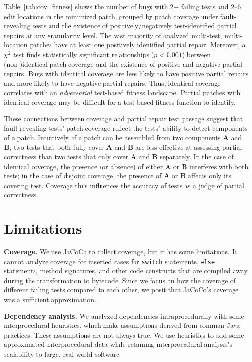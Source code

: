 \documentclass[10pt, conference]{IEEEtran}
\begin{document}
Table~\ref{tab:cov_fitness} shows the number of bugs with 2+ failing tests
and 2--6 edit locations in the minimized patch, grouped by patch coverage
under fault-revealing tests and the existence of positively/negatively test-identified
partial repairs at any granularity level.
The vast majority of analyzed multi-test, multi-location patches have at least
one positively identified partial repair.
Moreover, a $\chi^2$ test finds statistically significant relationships ($p < 0.001$)
between (non-)identical patch coverage and the existence of positive and
negative partial repairs. Bugs with identical coverage are less likely to have
positive partial repairs and more likely to have negative partial repairs.
Thus, identical coverage correlates with an
\emph{adversarial} test-based fitness landscape.
Partial patches with identical coverage may be difficult for a test-based
fitness function to identify.

These connections between coverage and partial repair test passage
suggest that fault-revealing tests' patch coverage reflect the tests' ability
to detect components of a patch.
Intuitively, if a patch can be
assembled from two components \textbf{A} and \textbf{B}, two tests that both
fully cover \textbf{A} and \textbf{B} are less effective at assessing partial
correctness than two tests that only cover \textbf{A} and \textbf{B} separately.
In the case of identical coverage, the presence (or absence) of either \textbf{A} or 
\textbf{B} interferes with both tests; in the case of disjoint coverage, the presence of 
\textbf{A} or \textbf{B} affects only its covering test.
Coverage thus influences the accuracy of tests as a judge of partial correctness.


\section{Limitations}
\label{sec:limits}

\noindent\textbf{Coverage.}
We use JaCoCo to collect coverage, but it has some
limitations. It cannot analyze coverage for inserted
cases for \texttt{switch} statements, \texttt{else} statements, method
signatures, and other code constructs that are compiled away during the
transformation to bytecode. Since we focus on how the coverage of different
failing tests compared to each other, we posit that JaCoCo's coverage was a
sufficient approximation.

\vspace{1ex}
\noindent\textbf{Dependency analysis.}
We analyzed dependencies intraprocedurally with some interprocedural 
heuristics, which make assumptions derived from common Java practices.
These assumptions are not always true. We use heuristics to add some
approximated interprocedural data while retaining interprocedural 
analysis's scalability to large, real world software.
\end{document}

